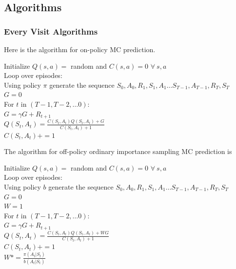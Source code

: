 \documentclass[11pt,a4paper]{article}
\begin{document}
\subsection{Algorithms}

\subsubsection{Every Visit Algorithms}
Here is the algorithm for on-policy MC prediction.

\begin{tcolorbox}[enhanced,title=On-policy prediction]
Initialize $Q(s,a)=$ random and $C(s,a)=0$ $\forall~s,a$ \\
Loop over episodes: \\
 \phantom{abcd} Using policy $\pi$ generate the sequence $S_0,A_0, R_1,S_1,A_1 \dots S_{T-1}, A_{T-1},R_T,S_T$ \\
 \phantom{abcd} $G=0$ \\
  \phantom{abcd} For $t$ in $(T-1,T-2,\dots 0)$: \\
  \phantom{abcd}   \phantom{abcd}  $G = \gamma G + R_{t+1}$ \\
  \phantom{abcd}   \phantom{abcd}  $Q(S_t,A_t) = \frac{C(S_t,A_t) Q(S_t,A_t) +G}{C(S_t,A_t)+1}$ \\
    \phantom{abcd}   \phantom{abcd}  $C(S_t,A_t) += 1$
\end{tcolorbox}

The algorithm for off-policy ordinary importance sampling MC prediction is

\begin{tcolorbox}[enhanced,title=Off-policy ordinary importance sampling prediction]
Initialize $Q(s,a)=$ random and $C(s,a)=0$ $\forall~s,a$ \\
Loop over episodes: \\
 \phantom{abcd} Using policy $b$ generate the sequence  $S_0,A_0, R_1,S_1,A_1 \dots S_{T-1}, A_{T-1},R_T,S_T$ \\
 \phantom{abcd} $G=0$ \\
  \phantom{abcd} $W=1$ \\
  \phantom{abcd} For $t$ in $(T-1,T-2,\dots 0)$: \\
  \phantom{abcd}   \phantom{abcd}  $G = \gamma G + R_{t+1}$ \\
  \phantom{abcd}   \phantom{abcd}  $Q(S_t,A_t) = \frac{C(S_t,A_t) Q(S_t,A_t) +W G}{C(S_t,A_t)+1}$ \\
    \phantom{abcd}   \phantom{abcd}  $C(S_t,A_t) += 1$ \\
    \phantom{abcd}   \phantom{abcd}  $W*= \frac{\pi(A_t|S_t)}{b(A_t|S_t)}$   
\end{tcolorbox}
\end{document}
